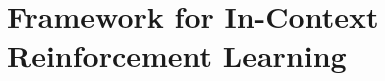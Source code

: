 \documentclass[10pt]{article}
\newcommand{\authnote}[2]{{\scriptsize $\ll$\textsf{#1 notes: #2}$\gg$}}
\newcommand{\authnote}[2]{}
\newcommand{\yub}[1]{{\color{red}\authnote{Yu}{#1}}}
\newcommand{\lc}[1]{{\color{blue}\authnote{Licong}{#1}}}
\begin{document}







\section{Framework for In-Context Reinforcement Learning}\label{sec:framework}


\end{document}
